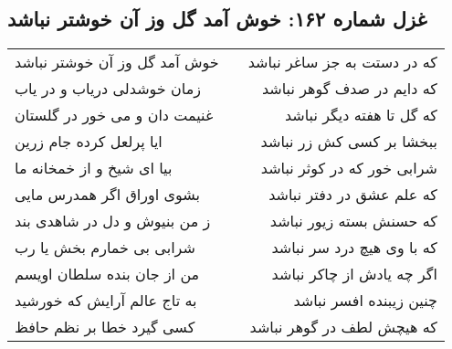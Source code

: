 \begin{center}
\section*{غزل شماره ۱۶۲: خوش آمد گل وز آن خوشتر نباشد}
\label{sec:sh162}
\begin{longtable}{l p{0.5cm} r}
خوش آمد گل وز آن خوشتر نباشد
&&
که در دستت به جز ساغر نباشد
\\
زمان خوشدلی دریاب و در یاب
&&
که دایم در صدف گوهر نباشد
\\
غنیمت دان و می خور در گلستان
&&
که گل تا هفته دیگر نباشد
\\
ایا پرلعل کرده جام زرین
&&
ببخشا بر کسی کش زر نباشد
\\
بیا ای شیخ و از خمخانه ما
&&
شرابی خور که در کوثر نباشد
\\
بشوی اوراق اگر همدرس مایی
&&
که علم عشق در دفتر نباشد
\\
ز من بنیوش و دل در شاهدی بند
&&
که حسنش بسته زیور نباشد
\\
شرابی بی خمارم بخش یا رب
&&
که با وی هیچ درد سر نباشد
\\
من از جان بنده سلطان اویسم
&&
اگر چه یادش از چاکر نباشد
\\
به تاج عالم آرایش که خورشید
&&
چنین زیبنده افسر نباشد
\\
کسی گیرد خطا بر نظم حافظ
&&
که هیچش لطف در گوهر نباشد
\\
\end{longtable}
\end{center}
